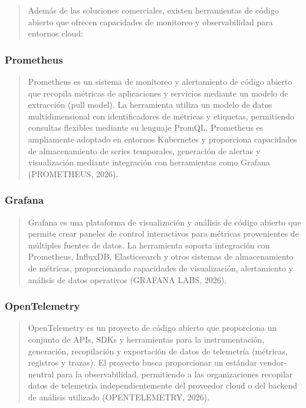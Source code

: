 \documentclass[
]{article}
\begin{document}
\begin{quote}
Además de las soluciones comerciales, existen herramientas de código
abierto que ofrecen capacidades de monitoreo y observabilidad para
entornos cloud:
\end{quote}

\subsubsection{Prometheus}\label{prometheus}

\begin{quote}
Prometheus es un sistema de monitoreo y alertamiento de código abierto
que recopila métricas de aplicaciones y servicios mediante un modelo de
extracción (pull model). La herramienta utiliza un modelo de datos
multidimensional con identificadores de métricas y etiquetas,
permitiendo consultas flexibles mediante su lenguaje PromQL. Prometheus
es ampliamente adoptado en entornos Kubernetes y proporciona capacidades
de almacenamiento de series temporales, generación de alertas y
visualización mediante integración con herramientas como Grafana
(PROMETHEUS, 2026).
\end{quote}

\subsubsection{Grafana}\label{grafana}

\begin{quote}
Grafana es una plataforma de visualización y análisis de código abierto
que permite crear paneles de control interactivos para métricas
provenientes de múltiples fuentes de datos. La herramienta soporta
integración con Prometheus, InfluxDB, Elasticsearch y otros sistemas de
almacenamiento de métricas, proporcionando capacidades de visualización,
alertamiento y análisis de datos operativos (GRAFANA LABS, 2026).
\end{quote}

\subsubsection{OpenTelemetry}\label{opentelemetry}

\begin{quote}
OpenTelemetry es un proyecto de código abierto que proporciona un
conjunto de APIs, SDKs y herramientas para la instrumentación,
generación, recopilación y exportación de datos de telemetría (métricas,
registros y trazas). El proyecto busca proporcionar un estándar
vendor-neutral para la observabilidad, permitiendo a las organizaciones
recopilar datos de telemetría independientemente del proveedor cloud o
del backend de análisis utilizado (OPENTELEMETRY, 2026).
\end{quote}
\end{document}
